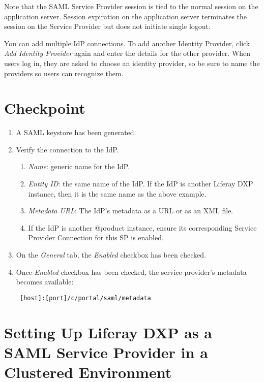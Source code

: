 Note that the SAML Service Provider session is tied to the normal
session on the application server. Session expiration on the application
server terminates the session on the Service Provider but does not
initiate single logout.

You can add multiple IdP connections. To add another Identity Provider,
click \emph{Add Identity Provider} again and enter the details for the
other provider. When users log in, they are asked to choose an identity
provider, so be sure to name the providers so users can recognize them.

\section{Checkpoint}\label{checkpoint-4}

\begin{enumerate}
\def\labelenumi{\arabic{enumi}.}
\item
  A SAML keystore has been generated.
\item
  Verify the connection to the IdP.

  \begin{enumerate}
  \def\labelenumii{\alph{enumii}.}
  \item
    \emph{Name}: generic name for the IdP.
  \item
    \emph{Entity ID}: the same name of the IdP. If the IdP is another
    Liferay DXP instance, then it is the same name as the above example.
  \item
    \emph{Metadata URL}: The IdP's metadata as a URL or as an XML file.
  \item
    If the IdP is another @product instance, ensure its corresponding
    Service Provider Connection for this SP is enabled.
  \end{enumerate}
\item
  On the \emph{General} tab, the \emph{Enabled} checkbox has been
  checked.
\item
  Once \emph{Enabled} checkbox has been checked, the service provider's
  metadata becomes available:

\begin{verbatim}
 [host]:[port]/c/portal/saml/metadata
\end{verbatim}
\end{enumerate}

\section{Setting Up Liferay DXP as a SAML Service Provider in a
Clustered
Environment}\label{setting-up-liferay-dxp-as-a-saml-service-provider-in-a-clustered-environment}

